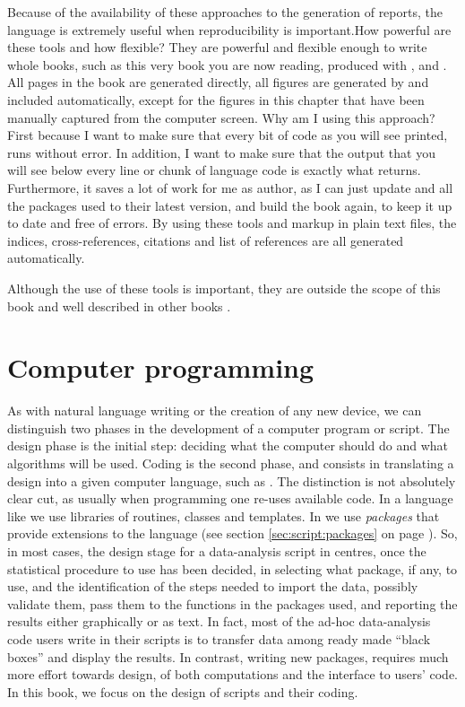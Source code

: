 \documentclass[krantz2]{krantz}\usepackage{knitr}
\begin{document}
Because of the availability of these approaches to the generation of reports, the \Rlang language is extremely useful when reproducibility is important.How powerful are these tools and how flexible? They are powerful and flexible enough to write whole books, such as this very book you are now reading, produced with \Rpgrm,  and \Latex. All pages in the book are generated directly, all figures are generated by \Rpgrm and included automatically, except for the figures in this chapter that have been manually captured from the computer screen. Why am I using this approach? First because I want to make sure that every bit of code as you will see printed, runs without error. In addition, I want to make sure that the output that you will see below every line or chunk of \Rlang language code is exactly what \Rpgrm returns. Furthermore, it saves a lot of work for me as author, as I can just update \Rpgrm and all the packages used to their latest version, and build the book again, to keep it up to date and free of errors. By using these tools and markup in plain text files, the indices, cross-references, citations and list of references are all generated automatically.

Although the use of these tools is important, they are outside the scope of this book and well described in other books \autocite{Gandrud2015,Xie2013}.

\section{Computer programming}

As with natural language writing or the creation of any new device, we can distinguish two phases in the development of a computer program or script. The design phase is the initial step: deciding what the computer should do and what algorithms will be used. Coding is the second phase, and consists in translating a design into a given computer language, such as \Rlang. The distinction is not absolutely clear cut, as usually when programming one re-uses available code. In a language like \Cpplang we use libraries of routines, classes and templates. In \Rlang we use \emph{packages} that provide extensions to the language (see section \ref{sec:script:packages} on page \pageref{sec:script:packages}). So, in most cases, the design stage for a data-analysis script in \Rlang centres, once the statistical procedure to use has been decided, in selecting what package, if any, to use, and the identification of the steps needed to import the data, possibly validate them, pass them to the functions in the packages used, and reporting the results either graphically or as text. In fact, most of the ad-hoc data-analysis code users write in their scripts is to transfer data among ready made ``black boxes'' and display the results. In contrast, writing new packages, requires much more effort towards design, of both computations and the interface to users' code. In this book, we focus on the design of scripts and their coding.
\end{document}
